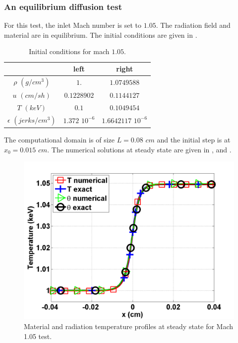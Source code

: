 \subsubsection{An equilibrium diffusion test}

For this test, the inlet Mach number is set to $1.05$. The radiation field and material are in equilibrium. The initial conditions are given in .
\begin{table}[h]
\begin{center}
\caption{\label{tbl:table3} Initial conditions for mach $1.05$.}
\begin{tabular}{|c|c|c|}
\hline 
 & left  & right \\ \hline
$\rho$ $(g/cm^3)$ &$1.$ & $1.0749588$ \\ \hline
$u$ $(cm/sh)$& $0.1228902$ & $0.1144127$ \\ \hline
$T$ $(keV)$& $0.1$ & $0.1049454$\\ \hline
$\epsilon$ $(jerks/cm^3)$ & $1.372$ $10^{-6}$ & $1.6642117$ $10^{-6}$\\
\hline
\end{tabular}
\end{center}  
\end{table}  
The computational domain is of size $L=0.08$ $cm$ and the initial step is at $x_0 = 0.015$ $cm$. The numerical solutions at steady state are given in ,  and . 
\begin{figure}[H]
                \centering
                \includegraphics[width=\textwidth]{figures/Mach_1p05_nel_500_temperature.png}
        \caption{Material and radiation temperature profiles at steady state for Mach 1.05 test.}\label{fig:Mach105_temp}
\end{figure}
